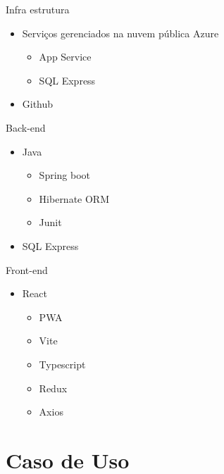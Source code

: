 \documentclass[%
    english,
    brazil]{ifsp-spo-beamer}
\begin{document}
\begin{frame}{Infra estrutura} 
    \begin{itemize}
        \item 
        Serviços gerenciados na nuvem pública Azure
            \begin{itemize}
                \item App Service
                \item SQL Express
            \end{itemize}
        
        \item
        Github
        
    \end{itemize}
\end{frame}

\begin{frame}{Back-end}
    \begin{itemize}
        \item Java
            \begin{itemize}
                \item Spring boot
                \item Hibernate ORM
                \item Junit
            \end{itemize}
        \item SQL Express
    \end{itemize}
\end{frame}

\begin{frame}{Front-end}
    \begin{itemize}
        \item React
            \begin{itemize}
                \item PWA
                \item Vite
                \item Typescript
                \item Redux
                \item Axios
            \end{itemize}
    \end{itemize}
\end{frame}

\section{Caso de Uso}
\end{document}
